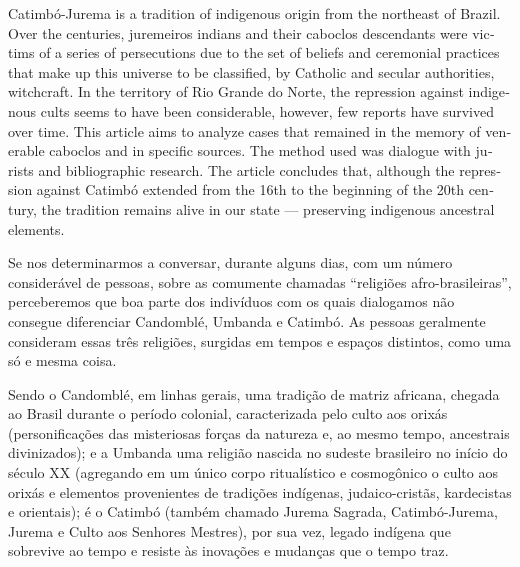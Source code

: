 \begin{refsection}
\begin{otherlanguage}{english}
    \begin{galoResumo}[Abstract]
        Catimbó-Jurema is a tradition of indigenous origin from the northeast of Brazil. Over the centuries, juremeiros indians and their caboclos descendants were victims of a series of persecutions due to the set of beliefs and ceremonial practices that make up this universe to be classified, by Catholic and secular authorities, witchcraft. In the territory of Rio Grande do Norte, the repression against indigenous cults seems to have been considerable, however, few reports have survived over time. This article aims to analyze cases that remained in the memory of venerable caboclos and in specific sources. The method used was dialogue with jurists and bibliographic research. The article concludes that, although the repression against Catimbó extended from the 16th to the beginning of the 20th century, the tradition remains alive in our state --- preserving indigenous ancestral elements.
    \end{galoResumo}
    
    \end{otherlanguage}

    Se nos determinarmos a conversar, durante alguns dias, com um número considerável de pessoas, sobre as comumente chamadas ``religiões afro-brasileiras'', perceberemos que boa parte dos indivíduos com os quais dialogamos não consegue diferenciar Candomblé, Umbanda e Catimbó. As pessoas geralmente consideram essas três religiões, surgidas em tempos e espaços distintos, como uma só e mesma coisa. 

    Sendo o Candomblé, em linhas gerais, uma tradição de matriz africana, chegada ao Brasil durante o período colonial, caracterizada pelo culto aos orixás (personificações das misteriosas forças da natureza e, ao mesmo tempo, ancestrais divinizados); e a Umbanda uma religião nascida no sudeste brasileiro no início do século XX (agregando em um único corpo ritualístico e cosmogônico o culto aos orixás e elementos provenientes de tradições indígenas, judaico-cristãs, kardecistas e orientais); é o Catimbó (também chamado Jurema Sagrada, Catimbó-Jurema, Jurema e Culto aos Senhores Mestres), por sua vez, legado indígena que sobrevive ao tempo e resiste às inovações e mudanças que o tempo traz. 


\end{refsection}
